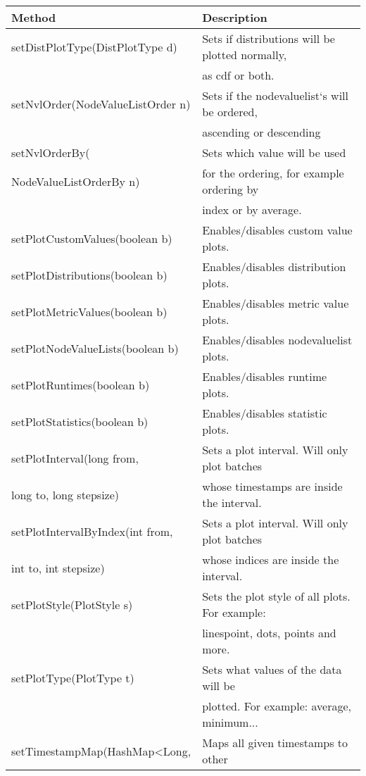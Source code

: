 \begin{table}[h]
\centering
\begin{tabular}[h]{|l|l|}\hline
	\textbf{Method} & \textbf{Description}\\
	\hline
	setDistPlotType(DistPlotType d) & Sets if distributions will be plotted 	normally,\\
	& as cdf or both.\\
	\hline
	setNvlOrder(NodeValueListOrder n) & Sets if the nodevaluelist‘s will be 	ordered,\\
	& ascending or descending\\
	\hline
	setNvlOrderBy( & Sets which value will be used\\
	NodeValueListOrderBy n) & for the ordering, for example ordering by\\
	& index or by average.\\
	\hline
	setPlotCustomValues(boolean b) & Enables/disables custom value plots.\\
	\hline
	setPlotDistributions(boolean b) & Enables/disables distribution plots.\\
	\hline
	setPlotMetricValues(boolean b) & Enables/disables metric value plots.\\
	\hline
	setPlotNodeValueLists(boolean b) & Enables/disables nodevaluelist plots.\\
	\hline
	setPlotRuntimes(boolean b) & Enables/disables runtime plots.\\
	\hline
	setPlotStatistics(boolean b) & Enables/disables statistic plots.\\
	\hline
	setPlotInterval(long from, & Sets a plot interval. Will only plot batches\\
	long to, long stepsize) & whose timestamps are inside the interval.\\
	\hline
	setPlotIntervalByIndex(int from, & Sets a plot interval. Will only plot batches\\
	int to, int stepsize) & whose indices are inside the interval.\\
	\hline
	setPlotStyle(PlotStyle s) & Sets the plot style of all plots. For example:\\
	& linespoint, dots, points and more.\\
	\hline
	setPlotType(PlotType t) & Sets what values of the data will be\\
	& plotted. For example: average, minimum...\\
	\hline
	setTimestampMap(HashMap\textless Long, & Maps all given timestamps to other\\

\end{tabular}
\end{table}
